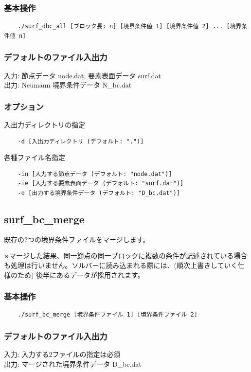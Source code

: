 \documentclass[8pt,a4paper]{article}
\begin{document}
\subsubsection*{基本操作}
\begin{verbatim}
	./surf_dbc_all [ブロック長: n] [境界条件値 1] [境界条件値 2] ... [境界条件値 n]
\end{verbatim}

\subsubsection*{デフォルトのファイル入出力}
入力: 節点データ node.dat, 要素表面データ surf.dat \\ \noindent
出力: Neumann 境界条件データ N\_bc.dat

\subsubsection*{オプション}
入出力ディレクトリの指定
\begin{verbatim}
    -d [入出力ディレクトリ (デフォルト: ".")]
\end{verbatim}
各種ファイル名指定
\begin{verbatim}
    -in [入力する節点データ (デフォルト: "node.dat")]
    -ie [入力する要素表面データ (デフォルト: "surf.dat")]
    -o [出力する境界条件データ (デフォルト: "D_bc.dat")]
\end{verbatim}

\subsection{surf\_bc\_merge}
既存の2つの境界条件ファイルをマージします。

※マージした結果、同一節点の同一ブロックに複数の条件が記述されている場合も処理は行いません。ソルバーに読み込まれる際には、(順次上書きしていく仕様のため) 後半にあるデータが採用されます。

\subsubsection*{基本操作}
\begin{verbatim}
	./surf_bc_merge [境界条件ファイル 1] [境界条件ファイル 2]
\end{verbatim}

\subsubsection*{デフォルトのファイル入出力}
入力: 入力する2ファイルの指定は必須 \\ \noindent
出力: マージされた境界条件データ D\_bc.dat
\end{document}
